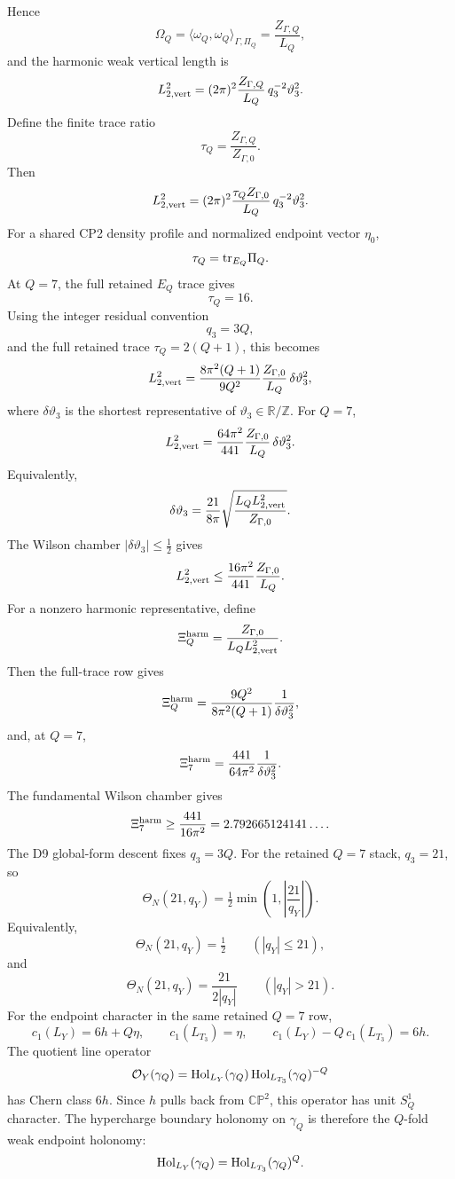 \documentclass[11pt]{article}
\theoremstyle{definition}
\theoremstyle{remark}
\newcommand{\CP}{\mathbb{CP}}
\newcommand{\half}{\tfrac12}
\begin{document}
Hence
\[
  \Omega_Q
  =
  \langle\omega_Q,\omega_Q\rangle_{\Gamma,\Pi_Q}
  =
  \frac{Z_{\Gamma,Q}}{L_Q},
\]
and the harmonic weak vertical length is
\[
  L_{2,{\rm vert}}^2
  =
  (2\pi)^2\frac{Z_{\Gamma,Q}}{L_Q}\,
  q_3^{-2}\vartheta_3^2 .
\]
Define the finite trace ratio
\[
  \tau_Q=\frac{Z_{\Gamma,Q}}{Z_{\Gamma,0}} .
\]
Then
\[
  L_{2,{\rm vert}}^2
  =
  (2\pi)^2
  \frac{\tau_QZ_{\Gamma,0}}{L_Q}\,
  q_3^{-2}\vartheta_3^2 .
\]
For a shared CP2 density profile and normalized endpoint vector \(\eta_0\),
\[
  \tau_Q={\rm tr}_{E_Q}\Pi_Q .
\]
At \(Q=7\), the full retained \(E_Q\) trace gives
\[
  \tau_Q=16 .
\]
Using the integer residual convention
\[
  q_3=3Q,
\]
and the full retained trace \(\tau_Q=2(Q+1)\), this becomes
\[
  L_{2,{\rm vert}}^2
  =
  \frac{8\pi^2(Q+1)}{9Q^2}
  \frac{Z_{\Gamma,0}}{L_Q}\,\delta\vartheta_3^2 ,
\]
where \(\delta\vartheta_3\) is the shortest representative of
\(\vartheta_3\in\mathbb R/\mathbb Z\).  For \(Q=7\),
\[
  L_{2,{\rm vert}}^2
  =
  \frac{64\pi^2}{441}
  \frac{Z_{\Gamma,0}}{L_Q}\,\delta\vartheta_3^2 .
\]
Equivalently,
\[
  \delta\vartheta_3
  =
  \frac{21}{8\pi}
  \sqrt{\frac{L_QL_{2,{\rm vert}}^2}{Z_{\Gamma,0}}}.
\]
The Wilson chamber \(|\delta\vartheta_3|\le\half\) gives
\[
  L_{2,{\rm vert}}^2
  \le
  \frac{16\pi^2}{441}\frac{Z_{\Gamma,0}}{L_Q}.
\]
For a nonzero harmonic representative, define
\[
  \Xi_Q^{\rm harm}
  =
  \frac{Z_{\Gamma,0}}{L_QL_{2,{\rm vert}}^2}.
\]
Then the full-trace row gives
\[
  \Xi_Q^{\rm harm}
  =
  \frac{9Q^2}{8\pi^2(Q+1)}
  \frac{1}{\delta\vartheta_3^2},
\]
and, at \(Q=7\),
\[
  \Xi_7^{\rm harm}
  =
  \frac{441}{64\pi^2}
  \frac{1}{\delta\vartheta_3^2}.
\]
The fundamental Wilson chamber gives
\[
  \Xi_7^{\rm harm}
  \ge
  \frac{441}{16\pi^2}
  =
  2.792665124141\ldots .
\]
The D9 global-form descent fixes \(q_3=3Q\).  For the retained \(Q=7\)
stack, \(q_3=21\), so
\[
  \Theta_N(21,q_Y)
  =
  \half\min\left(1,\left|\frac{21}{q_Y}\right|\right).
\]
Equivalently,
\[
  \Theta_N(21,q_Y)=\half
  \qquad (|q_Y|\le21),
\]
and
\[
  \Theta_N(21,q_Y)=\frac{21}{2|q_Y|}
  \qquad (|q_Y|>21).
\]
For the endpoint character in the same retained \(Q=7\) row,
\[
  c_1(L_Y)=6h+Q\eta,
  \qquad
  c_1(L_{T_3})=\eta,
  \qquad
  c_1(L_Y)-Q\,c_1(L_{T_3})=6h .
\]
The quotient line operator
\[
  {\cal O}_Y(\gamma_Q)
  =
  {\rm Hol}_{L_Y}(\gamma_Q)\,
  {\rm Hol}_{L_{T_3}}(\gamma_Q)^{-Q}
\]
has Chern class \(6h\).  Since \(h\) pulls back from \(\CP^2\), this operator
has unit \(S^1_Q\) character.  The hypercharge boundary holonomy on
\(\gamma_Q\) is therefore the \(Q\)-fold weak endpoint holonomy:
\[
  {\rm Hol}_{L_Y}(\gamma_Q)
  =
  {\rm Hol}_{L_{T_3}}(\gamma_Q)^Q .
\]
\end{document}
